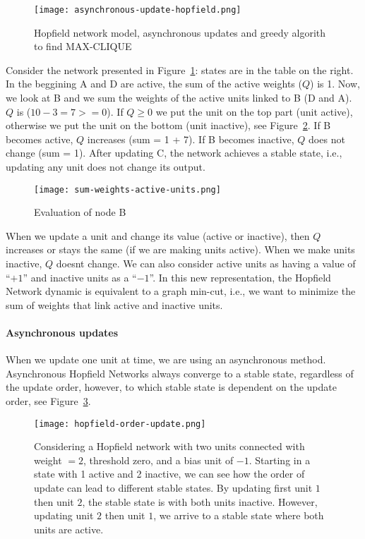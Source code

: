 \documentclass[main]{subfiles}
\begin{document}
\begin{figure}[H]
	\centering
	\texttt{[image: asynchronous-update-hopfield.png]}
	\caption{Hopfield network model, asynchronous updates and greedy algorith to find MAX-CLIQUE}
	\label{fig:asynchronous-update}
\end{figure}

Consider the network presented in Figure~\ref{fig:asynchronous-update}: states are in the table on the right.
In the beggining A and D are active, the sum of the active weights ($Q$) is 1.
Now, we look at B and we sum the weights of the active units linked to B (D and A).
$Q$ is ($10 - 3 = 7 >= 0$).
If $Q \geq 0$ we put the unit on the top part (unit active), otherwise we put the unit on the bottom (unit inactive), see Figure~\ref{fig:sum-weights}.
If B becomes active, $Q$ increases (sum = 1 + 7).
If B becomes inactive, $Q$ does not change (sum = 1).
After updating C, the network achieves a stable state, i.e., updating any unit does not change its output.

\begin{figure}[H]
	\centering
	\texttt{[image: sum-weights-active-units.png]}
	\caption{Evaluation of node B}
	\label{fig:sum-weights}
\end{figure}

When we update a unit and change its value (active or inactive), then $Q$ increases or stays the same (if we are making units active). When we make units inactive, $Q$ doesnt change.
We can also consider active units as having a value of ``$+1$'' and inactive units as a ``$-1$''.
In this new representation, the Hopfield Network dynamic is equivalent to a graph min-cut, i.e., we want to minimize the sum of weights that link active and inactive units.

\paragraph{Asynchronous updates}
When we update one unit at time, we are using an asynchronous method.
Asynchronous Hopfield Networks always converge to a stable state, regardless of the update order, however, to which stable state is dependent on the update order, see Figure~\ref{fig:hopfield-order-update}.

\begin{figure}[H]
	\centering
	\texttt{[image: hopfield-order-update.png]}
	\caption{Considering a Hopfield network with two units connected with weight $= 2$, threshold zero, and a bias unit of $-1$. Starting in a state with 1 active and 2 inactive, we can see how the order of update can lead to different stable states.
	By updating first unit $1$ then unit $2$, the stable state is with both units inactive. However, updating unit $2$ then unit $1$, we arrive to a stable state where both units are active.}
	\label{fig:hopfield-order-update}
\end{figure}
\end{document}

